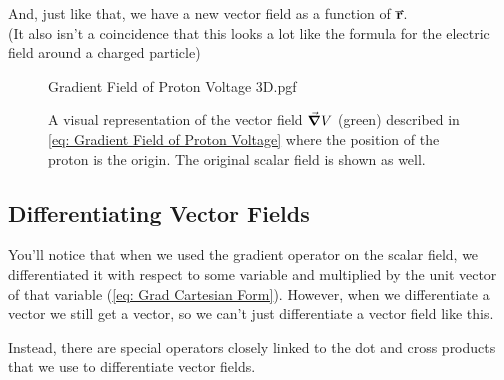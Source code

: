 \documentclass[main.tex]{subfiles}
\begin{document}
                    And, just like that, we have a new vector field as a function of $\vect{r}$.\\
                    (It also isn't a coincidence that this looks a lot like the formula for the electric field around a charged particle)

                    \begin{figure}[h]
                        \centering
                        \scalebox{1}
                        {
                            \begin{adjustbox}{clip,trim=20mm 25mm 20mm 20mm}
                                {{Gradient Field of Proton Voltage 3D.pgf}}
                            \end{adjustbox}
                        }
                        \captionsetup{singlelinecheck=off}
                        \caption[.]{A visual representation of the vector field $\protect \grad{V}$ (green) described in \eqref{eq: Gradient Field of Proton Voltage} where the position of the proton is the origin. The original scalar field is shown as well.}
                        \label{fig: Gradient Field of Proton Voltage 3D}
                    \end{figure}
                    \FloatBarrier
                    \vspace{2em}






            
            \newpage
 
            \subsection{Differentiating Vector Fields}
                \label{subsec: Differentiating Vector Fields}

                You'll notice that when we used the gradient operator on the scalar field, we differentiated it with respect to some variable and multiplied by the unit vector of that variable (\eqref{eq: Grad Cartesian Form}). However, when we differentiate a vector we still get a vector, so we can't just differentiate a vector field like this.
                
                Instead, there are special operators closely linked to the dot and cross products that we use to differentiate vector fields.
\end{document}
